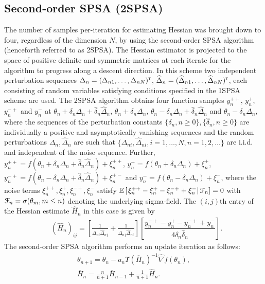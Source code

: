 \subsection{Second-order SPSA (2SPSA)}
The number of samples per-iteration for estimating Hessian was brought down to four, regardless of the dimension $N$, by using the second-order SPSA algorithm (henceforth referred to as 2SPSA). The Hessian estimator is projected to the space of positive definite and symmetric matrices at each iterate for the algorithm to progress along a descent direction. In this scheme two independent perturbation sequences $\Delta_n = (\Delta_{n1},\ldots,\Delta_{nN})^\mathsf{\scriptscriptstyle T}$, $\widehat \Delta_n = (\widehat \Delta_{n1},\ldots,\widehat \Delta_{nN})^\mathsf{\scriptscriptstyle T}$, each consisting of random variables satisfying conditions specified in the 1SPSA scheme are used.
The 2SPSA algorithm obtains four function samples $y_n^{++}$, $y_n^+$,  $y_n^{-+}$ and $y_n^{-}$ at $\theta_n + \delta_n \Delta_n + \widehat \delta_n \widehat \Delta_n $, $\theta_n +\delta_n \Delta_n$, $\theta_n - \delta_n \Delta_n + \widehat \delta_n \widehat \Delta_n$ and $\theta_n - \delta_n \Delta_n$, where  the sequences of the perturbation constants $\{\delta_n, n\ge 0\}, \{\widehat \delta_n, n\ge 0\}$ are individually a positive and asymptotically vanishing sequences and
the random perturbations $\Delta_n, \widehat \Delta_n$ are such that $\{\Delta_{ni},\widehat\Delta_{ni}, i=1,\ldots,N, n=1,2,\ldots\}$ are i.i.d. and independent of the noise sequence. Further, $y_n^{++} = f(\theta_n + \delta_n \Delta_n + \widehat \delta_n \widehat \Delta_n ) + \xi_n^{++}$, $y_n^+ = f(\theta_n+\delta_n \Delta_n) + \xi_n^+$, $y_n^{-+} = f(\theta_n - \delta_n \Delta_n + \widehat \delta_n \widehat \Delta_n) + \xi_n^{+-}$ and $y_n^- = f(\theta_n-\delta_n \Delta_n) + \xi_n^-$, where the noise terms $\xi_n^{++}, \xi_n^+, \xi_n^{-+}, \xi_n^-$ satisfy $\mathbb{E}\left[\left.\xi_n^{++} - \xi_n^+ - \xi_n^{-+} +  \xi_n^-\right| \mathcal{F}_n\right] = 0$ with $\mathcal{F}_n = \sigma(\theta_m,m\le n)$ denoting the underlying sigma-field. The $(i,j)$th entry of the Hessian estimate $\widehat H_n$ in this case is given by
\begin{align}
\label{eq:2spsahhat}
&\left(\widehat H_n\right)_{ij} = \left[\frac{1}{\Delta_{ni}\widehat \Delta_{nj}} + \frac{1}{\Delta_{nj}\widehat \Delta_{ni}} \right] \left[\dfrac{y_n^{++} - y_n^+ - y_n^{-+} + y_n^-}{4 \delta_n \widehat \delta_n}\right].
\end{align}
The second-order SPSA algorithm performs an update iteration as follows:
\begin{align}
\label{eq:2spsa}
\theta_{n+1} = \theta_n - a_n \Upsilon(\overline H_n)^{-1}\widehat\nabla f(\theta_n), \\
\overline H_n = \frac{n}{n+1} \overline H_{n-1} + \frac{1}{n+1} \widehat H_n.\label{eq:2spsa-H}
\end{align}
